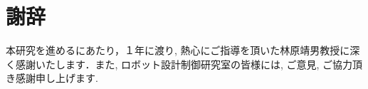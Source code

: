 \chapter*{謝辞}

本研究を進めるにあたり，１年に渡り, 熱心にご指導を頂いた林原靖男教授に深く感謝いたします．また, ロボット設計制御研究室の皆様には, ご意見, ご協力頂き感謝申し上げます.
%
